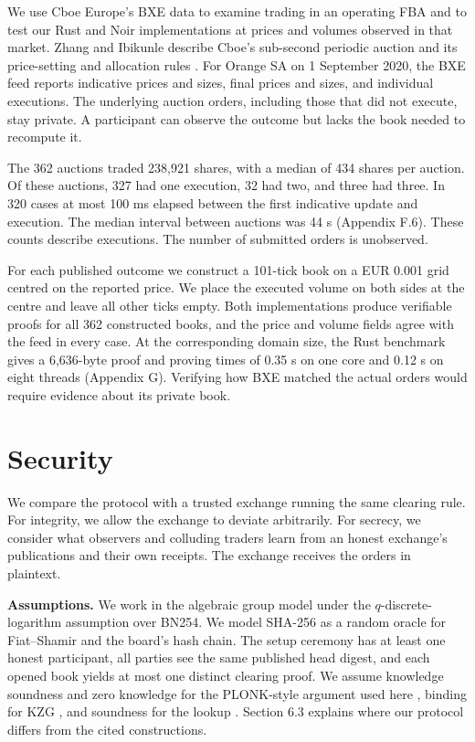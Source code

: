 We use Cboe Europe's BXE data to examine trading in an operating FBA and to test our Rust and Noir implementations at prices and volumes observed in that market. Zhang and Ibikunle describe Cboe's sub-second periodic auction and its price-setting and allocation rules \cite[Section~3.2]{zhang2023}. For Orange SA on 1 September 2020, the BXE feed \cite{cboepitch} reports indicative prices and sizes, final prices and sizes, and individual executions. The underlying auction orders, including those that did not execute, stay private. A participant can observe the outcome but lacks the book needed to recompute it.

The 362 auctions traded 238,921 shares, with a median of 434 shares per auction. Of these auctions, 327 had one execution, 32 had two, and three had three. In 320 cases at most 100 ms elapsed between the first indicative update and execution. The median interval between auctions was 44 s (Appendix F.6). These counts describe executions. The number of submitted orders is unobserved.

For each published outcome we construct a 101-tick book on a EUR 0.001 grid centred on the reported price. We place the executed volume on both sides at the centre and leave all other ticks empty. Both implementations produce verifiable proofs for all 362 constructed books, and the price and volume fields agree with the feed in every case. At the corresponding domain size, the Rust benchmark gives a 6,636-byte proof and proving times of 0.35 s on one core and 0.12 s on eight threads (Appendix G). Verifying how BXE matched the actual orders would require evidence about its private book.

\section{Security}

We compare the protocol with a trusted exchange running the same clearing rule. For integrity, we allow the exchange to deviate arbitrarily. For secrecy, we consider what observers and colluding traders learn from an honest exchange's publications and their own receipts. The exchange receives the orders in plaintext.

\textbf{Assumptions.} We work in the algebraic group model under the \(q\)-discrete-logarithm assumption over BN254. We model SHA-256 as a random oracle for Fiat--Shamir and the board's hash chain. The setup ceremony has at least one honest participant, all parties see the same published head digest, and each opened book yields at most one distinct clearing proof. We assume knowledge soundness and zero knowledge for the PLONK-style argument used here \cite{plonk2019,lipmaa2025,sefranek2024}, binding for KZG \cite{kzg2010}, and soundness for the lookup \cite{habock2022}. Section 6.3 explains where our protocol differs from the cited constructions.


